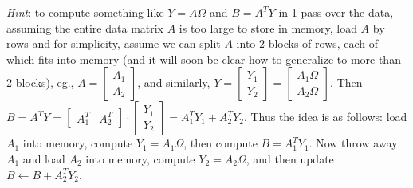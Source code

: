 \documentclass[10pt, letterpaper]{scrartcl}
\begin{document}
\begin{enumerate}[align=left, leftmargin=*, label=\sffamily\bfseries Problem \arabic*:]
        \emph{Hint}: to compute something like $Y=A\Omega$ and $B = A^TY$ in 1-pass over the data, assuming the entire data matrix $A$ is too large to store in memory, load $A$ by rows and for simplicity, assume we can split $A$ into 2 blocks of rows, each of which fits into memory (and it will soon be clear how to generalize to more than 2 blocks), eg., $A = \begin{bmatrix} A_1\\A_2\end{bmatrix}$, and similarly,
    $ Y = \begin{bmatrix} Y_1\\Y_2\end{bmatrix} = \begin{bmatrix} A_1\Omega\\A_2\Omega\end{bmatrix}$.
    Then $B = A^TY = \begin{bmatrix} A_1^T&A_2^T\end{bmatrix} \cdot \begin{bmatrix} Y_1\\Y_2\end{bmatrix}
    = A_1^TY_1 + A_2^TY_2$. Thus the idea is as follows: load $A_1$ into memory, compute $Y_1 = A_1\Omega$, then compute $B = A_1^T Y_1$. Now throw away $A_1$ and load $A_2$ into memory, compute $Y_2 = A_2\Omega$, and then update $B \gets B + A_2^T Y_2$.

\end{enumerate}   
\end{document}
